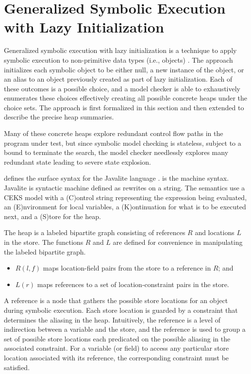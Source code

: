 \section{Generalized Symbolic Execution with Lazy Initialization}
Generalized symbolic execution with lazy initialization is a technique
to apply symbolic execution to non-primitive data types (i.e.,
objects) \cite{GSE03}. The approach initializes each symbolic object
to be either null, a new instance of the object, or an alias to an
object previously created as part of lazy initialization. Each of
these outcomes is a possible choice, and a model checker is able to
exhaustively enumerates these choices effectively creating all
possible concrete heaps under the choice sets. The approach is first formalized in this section and then extended to describe the precise heap summaries.


Many of these concrete
heaps explore redundant control flow paths in the program under test,
but since symbolic model checking is stateless, subject to a bound to
terminate the search, the model checker needlessly explores many
redundant state leading to severe state explosion.


 defines the surface syntax for the
Javalite language \cite{saints-MS}.  is
the machine syntax. Javalite is syntactic machine
defined as rewrites on a string. The semantics use a CEKS model with a (C)ontrol string representing the expression being
evaluated, an (E)nvironment for local variables, a (K)ontinuation for
what is to be executed next, and a (S)tore for the heap. 




The heap is a labeled bipartite graph consisting of references $R$ and
locations $L$ in the store. The functions $R$ and $L$ are defined for convenience
in manipulating the labeled bipartite graph.
\begin{itemize}
\item $R(l,f)$ maps location-field pairs from the store to a reference in $R$; and
\item $L(r)$ maps references to a set of location-constraint pairs in the store.
\end{itemize}
A reference is a node that gathers the possible store locations for an
object during symbolic execution. Each store location is guarded by a
constraint that determines the aliasing in the heap. Intuitively, the
reference is a level of indirection between a variable and the store,
and the reference is used to group a set of possible store locations
each predicated on the possible aliasing in the associated constraint.
For a variable (or field) to access any particular store location
associated with its reference, the corresponding constraint must be
satisfied.

